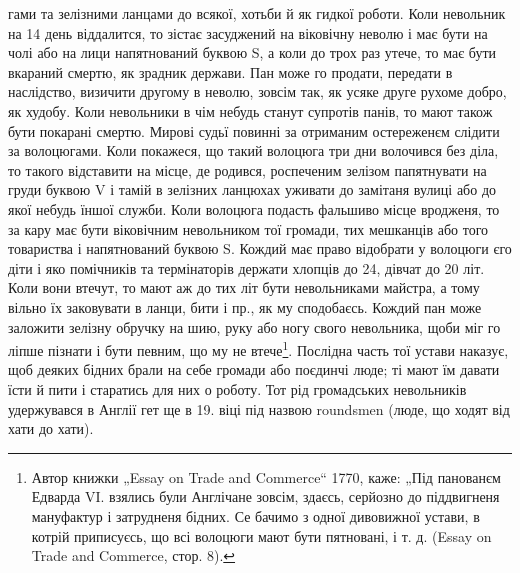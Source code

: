 гами та зелізними ланцами до всякої, хотьби й як гидкої роботи. Коли невольник на 14 день
віддалится, то зістає засуджений на віковічну неволю і має бути на чолі або на
лици напятнований буквою S, а коли до трох раз утече, то має бути вкараний смертю, як зрадник
держави. Пан може го продати, передати в наслідство, визичити другому в неволю, зовсім так, як усяке
друге рухоме добро, як худобу. Коли невольники в чім небудь станут супротів панів, то мают також
бути покарані смертю. Мирові судьї повинні за отриманим остереженєм слідити за волоцюгами. Коли
покажеся, що такий волоцюга три дни волочився без діла, то такого відставити на місце, де родився,
роспеченим зелізом папятнувати на груди буквою V і тамій в зелізних ланцюхах
уживати до замітаня вулиці або до якої небудь їншої служби. Коли волоцюга подасть фальшиво місце
вродженя, то за кару має бути віковічним невольником тої громади,
тих мешканців або того товариства і напятнований буквою S. Кождий має право відобрати у волоцюги єго
діти і яко помічників та термінаторів держати хлопців до 24, дівчат до 20 літ. Коли вони втечут, то
мают аж до тих літ бути невольниками майстра, а тому вільно їх заковувати в ланци, бити і пр., як му
сподобаєсь. Кождий пан може заложити зелізну обручку на шию, руку або ногу свого невольника, щоби
міг го ліпше пізнати і бути певним, що му не втече\footnote{
Автор книжки „Essay on Trade and Commerce“ 1770, каже: „Під панованєм Едварда VI. взялись
були Англічане зовсім, здаєсь, серйозно до піддвигненя мануфактур і затрудненя бідних. Се бачимо з
одної дивовижної устави, в котрій приписуєсь, що всі волоцюги мают бути пятновані, і т. д. (Essay on
Trade and Commerce, стор. 8).
}. Послідна часть тої устави наказує, щоб
деяких бідних брали на себе громади або поєдинчі люде; ті мают їм давати їсти
й пити і старатись для них о роботу. Тот рід громадських невольників удержувався в Англії гет ще в
19. віці під назвою roundsmen (люде, що ходят від хати до хати).

